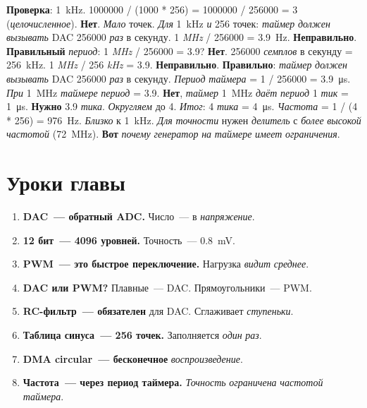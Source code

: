 \begin{keybox}
\textbf{Проверка}: \SI{1}{\kilo\hertz}. \num{1000000}
/ (\num{1000} * \num{256}) = \num{1000000} / \num{256000}
= \num{3} (\emph{целочисленное}). \textbf{Нет}. \emph{Мало}
точек. \emph{Для} \SI{1}{\kilo\hertz} \emph{и} \num{256}
точек: \emph{таймер} \emph{должен} \emph{вызывать} DAC
\num{256000} \emph{раз} в секунду. \num{1} \emph{MHz}
/ \num{256000} = \SI{3.9}{\hertz}. \textbf{Неправильно}.
\textbf{Правильный} \emph{период}: \num{1} \emph{MHz}
/ \num{256000} = \num{3.9}? \textbf{Нет}. \num{256000}
\emph{семплов} в секунду = \SI{256}{\kilo\hertz}. \num{1}
\emph{MHz} / \num{256} \emph{kHz} = \num{3.9}. \textbf{Неправильно}.
\textbf{Правильно}: \emph{таймер} \emph{должен}
\emph{вызывать} DAC \num{256000} \emph{раз} в секунду.
\emph{Период} \emph{таймера} = \num{1} / \num{256000}
= \SI{3.9}{\micro\second}. \emph{При} \SI{1}{\mega\hertz}
\emph{таймере} \emph{период} = \num{3.9}. \textbf{Нет},
\emph{таймер} \SI{1}{\mega\hertz} \emph{даёт}
\emph{период} \num{1} \emph{тик} = \SI{1}{\micro\second}.
\textbf{Нужно} \num{3.9} \emph{тика}. \emph{Округляем}
до \num{4}. \emph{Итог}: \num{4} \emph{тика} = \SI{4}{\micro\second}.
\emph{Частота} = \num{1} / (\num{4} * \num{256}) = \SI{976}{\hertz}.
\emph{Близко} к \SI{1}{\kilo\hertz}. \emph{Для} \emph{точности}
нужен \emph{делитель} с \emph{более} \emph{высокой}
\emph{частотой} (\SI{72}{\mega\hertz}). \textbf{Вот} \emph{почему}
\emph{генератор} \emph{на} \emph{таймере} \emph{имеет}
\emph{ограничения}.
\end{keybox}

\section{Уроки главы}
\label{sec:gen-lessons}

\begin{enumerate}
    \item \textbf{DAC~--- обратный ADC.} Число~---
          в \emph{напряжение}.
    \item \textbf{12 бит~--- 4096 уровней.} Точность~---
      \SI{0.8}{\milli\volt}.
    \item \textbf{PWM~--- это быстрое переключение.}
          Нагрузка \emph{видит} \emph{среднее}.
    \item \textbf{DAC или PWM?} Плавные~--- DAC.
          Прямоугольники~--- PWM.
    \item \textbf{RC-фильтр~--- обязателен} для DAC.
          Сглаживает \emph{ступеньки}.
    \item \textbf{Таблица синуса~--- 256 точек.}
          Заполняется \emph{один} \emph{раз}.
    \item \textbf{DMA circular~--- бесконечное}
          \emph{воспроизведение}.
    \item \textbf{Частота~--- через период таймера.}
          \emph{Точность} \emph{ограничена} \emph{частотой}
          \emph{таймера}.
\end{enumerate}



